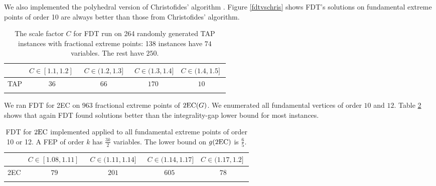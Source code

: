 We also implemented the polyhedral version of Christofides' algorithm \cite{Wolsey1980}. Figure \ref{fdtvschris} shows FDT's solutions on fundamental extreme points of order 10 are always better than those from Christofides' algorithm.
\vspace*{-.2in}
\begin{table}[h!]
\begin{small}
	\centering
	  \begin{tabular}{c c c c c}
	  \toprule
	  	& $C\in [1.1,1.2]\;$ & $\;C\in (1.2,1.3]\;$ &
               $\;C\in (1.3,1.4]$ &\; $C\in (1.4,1.5]\;$ \\ \midrule
	  	TAP & $36$ & $66$ & $170$ & $10$\\  \bottomrule \\
	  \end{tabular}\caption{The scale factor $C$ for FDT run on 264 randomly generated TAP instances with fractional extreme points: 138 instances have $74$ variables. The rest have $250$.}
\end{small}
	  \label{tableTAP}
\end{table}
We ran FDT for 2EC on 963 fractional extreme points of $\operatorname{2EC}(G)$. We enumerated all fundamental vertices of order $10$ and $12$. Table \ref{table2EC} shows that again FDT found solutions better than the integrality-gap lower bound for most instances. 
\begin{table}[h!]
\begin{small}
	\centering
	  \begin{tabular}{c c c c c}
	  	\toprule
	  	& $C\in [1.08,1.11]\;$ & $\;C\in (1.11,1.14]\;$ &
               $\;C\in (1.14,1.17]$ &\; $C\in (1.17,1.2]\;$ \\ \midrule
	  	2EC & $79$ & $201$ & $605$ & $78$ \\ \bottomrule\\
	  \end{tabular}	\caption{FDT for $\operatorname{2EC}$ implemented applied to all fundamental extreme points of order 10 or 12. A FEP of order $k$ has $\frac{3k}{2}$ variables. The lower bound on $g(\operatorname{2EC})$ is $\frac{6}{5}$.}
	  \label{table2EC}
\end{small}
\end{table}
